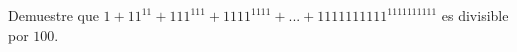 Demuestre que $1 + 11^{11} + 111^{111} + 1111^{1111} +...+ 1111111111^{1111111111}$ es divisible por $100$. 

